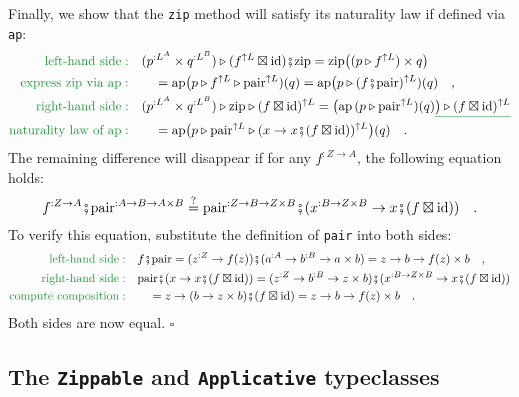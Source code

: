 Finally, we show that the \lstinline!zip! method will satisfy its
naturality law if defined via \lstinline!ap!:
\begin{align*}
{\color{greenunder}\text{left-hand side}:}\quad & (p^{:L^{A}}\times q^{:L^{B}})\triangleright(f^{\uparrow L}\boxtimes\text{id})\bef\text{zip}=\text{zip}\big((p\triangleright f^{\uparrow L})\times q\big)\\
{\color{greenunder}\text{express }\text{zip}\text{ via }\text{ap}:}\quad & \quad=\text{ap}\big(p\triangleright f^{\uparrow L}\triangleright\text{pair}^{\uparrow L})(q)=\text{ap}\big(p\triangleright(f\bef\text{pair})^{\uparrow L})(q)\quad,\\
{\color{greenunder}\text{right-hand side}:}\quad & (p^{:L^{A}}\times q^{:L^{B}})\triangleright\text{zip}\triangleright(f\boxtimes\text{id})^{\uparrow L}=\big(\text{ap}\,(p\triangleright\text{pair}^{\uparrow L})(q)\gunderline{\big)\triangleright(f\boxtimes\text{id})^{\uparrow L}}\\
{\color{greenunder}\text{naturality law of }\text{ap}:}\quad & \quad=\text{ap}\big(p\triangleright\text{pair}^{\uparrow L}\triangleright(x\rightarrow x\bef(f\boxtimes\text{id}))^{\uparrow L}\big)(q)\quad.
\end{align*}
The remaining difference will disappear if for any $f^{:Z\rightarrow A}$,
the following equation holds:
\[
f^{:Z\rightarrow A}\bef\text{pair}^{:A\rightarrow B\rightarrow A\times B}\overset{?}{=}\text{pair}^{:Z\rightarrow B\rightarrow Z\times B}\bef(x^{:B\rightarrow Z\times B}\rightarrow x\bef(f\boxtimes\text{id}))\quad.
\]
To verify this equation, substitute the definition of \lstinline!pair!
into both sides:
\begin{align*}
{\color{greenunder}\text{left-hand side}:}\quad & f\bef\text{pair}=(z^{:Z}\rightarrow f(z))\bef(a^{:A}\rightarrow b^{:B}\rightarrow a\times b)=z\rightarrow b\rightarrow f(z)\times b\quad,\\
{\color{greenunder}\text{right-hand side}:}\quad & \text{pair}\bef(x\rightarrow x\bef(f\boxtimes\text{id}))=(z^{:Z}\rightarrow b^{:B}\rightarrow z\times b)\bef(x^{:B\rightarrow Z\times B}\rightarrow x\bef(f\boxtimes\text{id}))\\
{\color{greenunder}\text{compute composition}:}\quad & \quad=z\rightarrow(b\rightarrow z\times b)\bef(f\boxtimes\text{id})=z\rightarrow b\rightarrow f(z)\times b\quad.
\end{align*}
Both sides are now equal. $\square$

\subsection{The \texttt{Zippable} and \texttt{Applicative} typeclasses}

